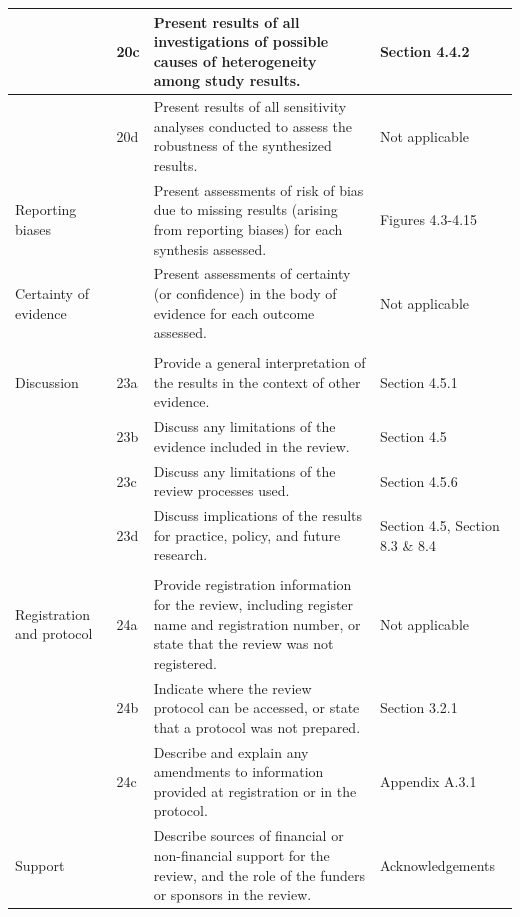 \documentclass[a4paper, twoside]{templates/ociamthesis}
\begin{document}
\begin{longtable}[t]{>{\raggedright\arraybackslash}p{8.45em}>{\centering\arraybackslash}p{2.1em}>{\raggedright\arraybackslash}p{13.5em}>{\raggedright\arraybackslash}p{7.45em}}
\midrule
\addlinespace
 & 20c & Present results of all investigations of possible causes of heterogeneity among study results. & Section 4.4.2\\
\midrule
\addlinespace
 & 20d & Present results of all sensitivity analyses conducted to assess the robustness of the synthesized results. & Not applicable\\
\midrule
\addlinespace
Reporting biases & 21 & Present assessments of risk of bias due to missing results (arising from reporting biases) for each synthesis assessed. & Figures 4.3-4.15\\
\midrule
\addlinespace
Certainty of evidence & 22 & Present assessments of certainty (or confidence) in the body of evidence for each outcome assessed. & Not applicable\\
\midrule
\addlinespace
\cellcolor[HTML]{FFFFCC}{\textbf{DISCUSSION}} & \cellcolor[HTML]{FFFFCC}{\textbf{}} & \cellcolor[HTML]{FFFFCC}{\textbf{}} & \cellcolor[HTML]{FFFFCC}{\textbf{}}\\
\midrule
\addlinespace
Discussion & 23a & Provide a general interpretation of the results in the context of other evidence. & Section 4.5.1\\
\midrule
\addlinespace
 & 23b & Discuss any limitations of the evidence included in the review. & Section 4.5\\
\midrule
\addlinespace
 & 23c & Discuss any limitations of the review processes used. & Section 4.5.6\\
\midrule
\addlinespace
 & 23d & Discuss implications of the results for practice, policy, and future research. & Section 4.5, Section 8.3 \& 8.4\\
\midrule
\addlinespace
\cellcolor[HTML]{FFFFCC}{\textbf{OTHER INFORMATION}} & \cellcolor[HTML]{FFFFCC}{\textbf{}} & \cellcolor[HTML]{FFFFCC}{\textbf{}} & \cellcolor[HTML]{FFFFCC}{\textbf{}}\\
\midrule
\addlinespace
Registration and protocol & 24a & Provide registration information for the review, including register name and registration number, or state that the review was not registered. & Not applicable\\
\midrule
\addlinespace
 & 24b & Indicate where the review protocol can be accessed, or state that a protocol was not prepared. & Section 3.2.1\\
\midrule
\addlinespace
 & 24c & Describe and explain any amendments to information provided at registration or in the protocol. & Appendix A.3.1\\
\midrule
\addlinespace
Support & 25 & Describe sources of financial or non-financial support for the review, and the role of the funders or sponsors in the review. & Acknowledgements\\

\end{longtable}
\end{document}
